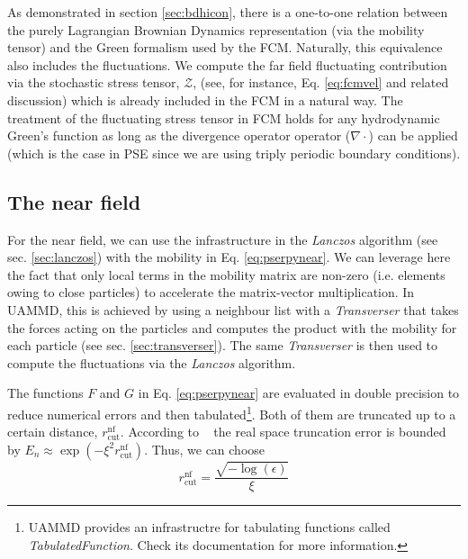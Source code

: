 \documentclass[ twoside,openright,titlepage,numbers=noenddot,%
headinclude,footinclude,cleardoublepage=empty,abstract=on,
BCOR=5mm,paper=b5,fontsize=11pt, dvipsnames
]{scrreprt}
\newcommand{\uammd}{\gls{UAMMD}\xspace}
\begin{document}
As demonstrated in section \ref{sec:bdhicon}, there is a one-to-one relation between the purely Lagrangian Brownian Dynamics representation (via the mobility tensor) and the Green formalism used by the \gls{FCM}. Naturally, this equivalence also includes the fluctuations. We compute the far field fluctuating contribution via the stochastic stress tensor, $\mathcal{Z}$, (see, for instance, Eq. \eqref{eq:fcmvel} and related discussion) which is already included in the \gls{FCM} in a natural way. The treatment of the fluctuating stress tensor in \gls{FCM} holds for any hydrodynamic Green's function as long as the divergence operator operator ($\nabla\cdot$) can be applied (which is the case in \gls{PSE} since we are using triply periodic boundary conditions).
\subsection*{The near field}

For the near field, we can use the infrastructure in the \emph{Lanczos} algorithm (see sec. \ref{sec:lanczos}) with the mobility in Eq. \eqref{eq:pserpynear}. We can leverage here the fact that only local terms in the mobility matrix are non-zero (i.e. elements owing to close particles) to accelerate the matrix-vector multiplication. In \uammd, this is achieved by using a neighbour list with a \emph{Transverser} that takes the forces acting on the particles and computes the product with the mobility for each particle (see sec. \ref{sec:transverser}). The same \emph{Transverser} is then used to compute the fluctuations via the \emph{Lanczos} algorithm.

The functions $F$ and $G$ in Eq. \eqref{eq:pserpynear} are evaluated in double precision to reduce numerical errors and then tabulated\footnote{\uammd provides an infrastructre for tabulating functions called \emph{TabulatedFunction}. Check its documentation for more information.}. Both of them are truncated up to a certain distance, $r_{\textrm{cut}}^{\textrm{nf}}$. According to ~\cite{Lindbo2011} the real space truncation error is bounded by $E_n\approx \exp(-\xi^2r_{\textrm{cut}}^{\textrm{nf}})$. Thus, we can choose
\begin{equation}
r_{\textrm{cut}}^{\textrm{nf}} = \frac{\sqrt{-\log(\epsilon)}}{\xi}
\end{equation}
\end{document}
